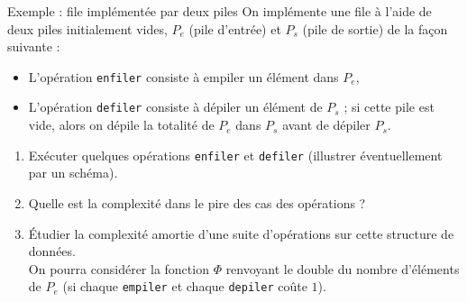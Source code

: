 \documentclass[10pt]{beamer}
\begin{document}
\begin{frame}{\Ctitle}{\stitle}
	\begin{exampleblock}{Exemple : file implémentée par deux piles}
		On implémente une file à l'aide de deux piles initialement vides, $P_e$ (pile d'entrée) et $P_s$ (pile de sortie) de la façon suivante :
		\begin{itemize}
		\item L'opération {\tt enfiler} consiste à empiler un élément dans $P_e$,
		\item L'opération {\tt defiler} consiste à dépiler un élément de $P_s$ ; si cette pile est vide, alors on dépile la totalité de $P_e$ dans $P_s$ avant de dépiler $P_s$.
		\end{itemize}
		\begin{enumerate}
		\item<2-> Exécuter quelques opérations {\tt enfiler} et {\tt defiler} (illustrer éventuellement par un schéma).
		\item<3-> Quelle est la complexité dans le pire des cas des opérations ?
		\item<4-> Étudier la complexité amortie d'une suite d'opérations sur cette structure de données. \\
		\textcolor{OliveGreen}{\small \aide} On pourra considérer la fonction $\Phi$ renvoyant le double du nombre d'éléments de $P_e$ (si chaque {\tt empiler} et chaque {\tt depiler} coûte $1$).
		\end{enumerate}
	\end{exampleblock}
\end{frame}
\end{document}

